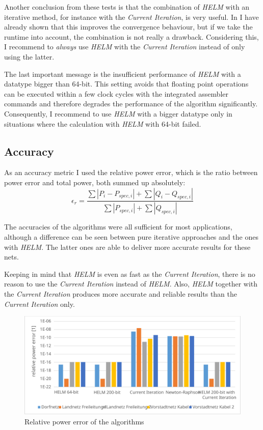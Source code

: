 Another conclusion from these tests is that the combination of \emph{HELM} with an iterative method, for instance with the \emph{Current Iteration}, is very useful. In  I have already shown that this improves the convergence behaviour, but if we take the runtime into account, the combination is not really a drawback. Considering this, I recommend to \emph{always} use \emph{HELM} with the \emph{Current Iteration} instead of only using the latter.

The last important message is the insufficient performance of \emph{HELM} with a datatype bigger than 64-bit. This setting avoids that floating point operations can be executed within a few clock cycles with the integrated assembler commands and therefore degrades the performance of the algorithm significantly. Consequently, I recommend to use \emph{HELM} with a bigger datatype only in situations where the calculation with \emph{HELM} with 64-bit failed.

\subsection{Accuracy}

As an accuracy metric I used the relative power error, which is the ratio between power error and total power, both summed up absolutely:
\begin{equation}
	\epsilon_r = \frac{\sum |P_i - P_{spec,i}| + \sum |Q_i - Q_{spec,i}|}{\sum |P_{spec,i}| + \sum |Q_{spec,i}|}
\end{equation}

The accuracies of the algorithms  were all sufficient for most applications, although a difference can be seen between pure iterative approaches and the ones with \emph{HELM}. The latter ones are able to deliver more accurate results for these nets.

Keeping in mind that \emph{HELM} is even as fast as the \emph{Current Iteration}, there is no reason to use the \emph{Current Iteration} instead of \emph{HELM}. Also, \emph{HELM} together with the \emph{Current Iteration} produces more accurate and reliable results than the \emph{Current Iteration} only.

\begin{figure}
	\centering
	\includegraphics[scale=0.7]{figures/comparison_accuracy}
	\caption[Comparison, accuracy]{Relative power error of the algorithms}
	\label{fig:comparison_accuracy}
\end{figure}

